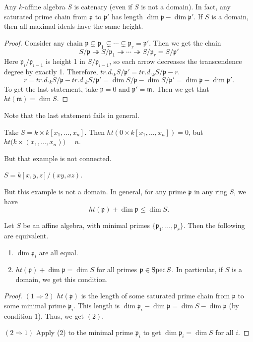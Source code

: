 \begin{theorem}
   Any $k$-affine algebra $S$ is catenary (even if $S$ is not a domain). In fact, any
   saturated prime chain from $\mathfrak{p}$ to $\mathfrak{p}'$ has length $\dim \mathfrak{p} - \dim \mathfrak{p}'$. If $S$ is a
   domain, then all maximal ideals have the same height.
 \end{theorem}
 \begin{proof}
   Consider any chain $\mathfrak{p}\subsetneq \mathfrak{p}_1\subsetneq \cdots \subsetneq \mathfrak{p}_r = \mathfrak{p}'$. Then we
   get the chain
   \[
    S/\mathfrak{p} \twoheadrightarrow S/\mathfrak{p}_1 \twoheadrightarrow \cdots \twoheadrightarrow S/\mathfrak{p}_r
    = S/\mathfrak{p}'
   \]
   Here $\mathfrak{p}_i/\mathfrak{p}_{i-1}$ is height 1 in $S/\mathfrak{p}_{i-1}$, so each arrow decreases the
   transcendence degree by exactly 1. Therefore, $tr.d._k S/\mathfrak{p}' = tr.d._k S/\mathfrak{p} -r$.
   \[
    r = tr.d._k S/\mathfrak{p} - tr.d._k S/\mathfrak{p}' = \dim S/\mathfrak{p} - \dim S/\mathfrak{p}' = \dim \mathfrak{p}-\dim \mathfrak{p}'.
   \]
   To get the last statement, take $\mathfrak{p}=0$ and $\mathfrak{p}'=\mathfrak{m}$. Then we get that $ht(\mathfrak{m})=\dim S$.
 \end{proof}
 Note that the last statement fails in general.
 \begin{example}
   Take $S=k\times k[x_1,\dots, x_n]$. Then $ht(0\times k[x_1,\dots, x_n])=0$, but
   $ht\bigl(k\times (x_1,\dots, x_n)\bigr) = n$.
 \end{example}
 But that example is not connected.
 \begin{example}
   $S = k[x,y,z]/(xy,xz)$.
 \end{example}
 But this example is not a domain. In general, for any prime $\mathfrak{p}$ in any ring $S$, we
 have
 \[
    ht(\mathfrak{p}) + \dim \mathfrak{p} \le \dim S.
 \]
 \begin{theorem}
   Let $S$ be an affine algebra, with  minimal primes $ \{\mathfrak{p}_1,\dots, \mathfrak{p}_r\}$. Then the following
   are equivalent.
   \begin{enumerate}
     \item $\dim \mathfrak{p}_i$ are all equal.
     \item $ht(\mathfrak{p})+\dim \mathfrak{p} =\dim S$ for all primes $\mathfrak{p}\in \operatorname{Spec} S$. In particular, if $S$
     is a domain, we get this condition.
   \end{enumerate}
 \end{theorem}
 \begin{proof}
   $(1\Rightarrow 2)$ $ht(\mathfrak{p})$ is the length of some saturated prime chain from $\mathfrak{p}$ to
   some minimal prime $\mathfrak{p}_i$. This length is $\dim \mathfrak{p}_i - \dim \mathfrak{p} = \dim S - \dim \mathfrak{p}$ (by
   condition 1). Thus, we get $(2)$.

   $(2\Rightarrow 1)$ Apply (2) to the minimal prime $\mathfrak{p}_i$ to get $\dim \mathfrak{p}_i=\dim S$ for
   all $i$.
 \end{proof}
